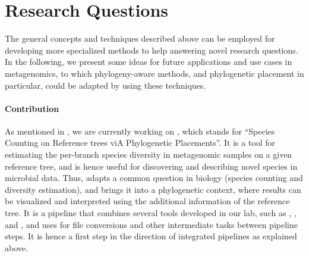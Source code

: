 \section{Research Questions}
\label{ch:ConclusionOutlook:sec:ResearchQuestions}


The general concepts and techniques described above %
can be employed for developing more specialized methods to help answering novel research questions.
In the following, we present some ideas for future applications and use cases in metagenomics,
to which phylogeny-aware methods, and phylogenetic placement in particular, could be adapted
by using these techniques.

\paragraph{Contribution}
\label{ch:ConclusionOutlook:sec:ResearchQuestions:par:Contribution}

As mentioned in , we are currently working on ,
which stands for ``Species Counting on Reference trees viA Phylogenetic Placements''.
It is a tool for estimating the per-branch species diversity in metagenomic samples on a given reference tree,
and is hence useful for discovering and describing novel species in microbial data.
Thus,  adapts a common question in biology (species counting and diversity estimation),
and brings it into a phylogenetic context,
where results can be visualized and interpreted using the additional information of the reference tree.
It is a pipeline that combines several tools developed in our lab, such as
 \cite{Barbera2018},  \cite{Morel2019}, and  \cite{Kapli2017},
and uses  \cite{Czech2019-genesis-gappa} for file conversions
and other intermediate tasks between pipeline steps.
It is hence a first step in the direction of integrated pipelines as explained above.

